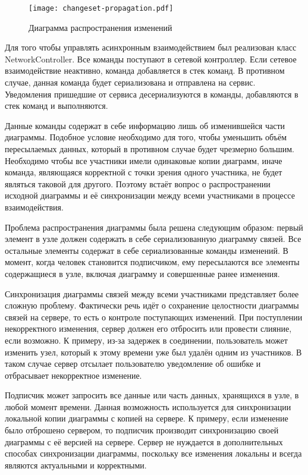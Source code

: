 \begin{figure}
  \centering
  \texttt{[image: changeset-propagation.pdf]}
  \caption{Диаграмма распространения изменений}
  \label{img:changeset_propagation}
\end{figure}

Для того чтобы управлять асинхронным взаимодействием был реализован класс
NetworkController. Все команды поступают в сетевой контроллер. Если сетевое
взаимодействие неактивно, команда добавляется в стек команд. В противном
случае, данная команда будет сериализована и отправлена на сервис. Уведомления
пришедшие от сервиса десериализуются в команды, добавляются в стек команд и
выполняются.

Данные команды содержат в себе информацию лишь об изменившейся части диаграммы.
Подобное условие необходимо для того, чтобы уменьшить объём пересылаемых данных,
который в противном случае будет чрезмерно большим. Необходимо чтобы все
участники имели одинаковые копии диаграмм, иначе команда, являющаяся корректной
с точки зрения одного участника, не будет являться таковой для другого. Поэтому
встаёт вопрос о распространении исходной диаграммы и её синхронизации между
всеми участниками в процессе взаимодействия.

Проблема распространения диаграммы была решена следующим образом: первый элемент
в узле должен содержать в себе сериализованную диаграмму связей. Все остальные
элементы содержат в себе сериализованные команды изменений. В момент, когда
человек становится подписчиком, ему пересылаются все элементы содержащиеся в
узле, включая диаграмму и совершенные ранее изменения.

Синхронизация диаграммы связей между всеми участниками представляет более
сложную проблему. Фактически речь идёт о сохранение целостности диаграммы связей
на сервере, то есть о контроле поступающих изменений. При поступлении
некорректного изменения, сервер должен его отбросить или провести слияние, если
возможно. К примеру, из-за задержек в соединении, пользователь может изменить
узел, который к этому времени уже был удалён одним из участников. В таком случае
сервер отсылает пользователю уведомление об ошибке и отбрасывает некорректное
изменение.

Подписчик может запросить все данные или часть данных, хранящихся в узле, в
любой момент времени. Данная возможность используется для синхронизации
локальной копии диаграммы с копией на сервере. К примеру, если изменение было
отброшено сервером, то подписчик производит синхронизацию своей диаграммы с её
версией на сервере. Сервер не нуждается в дополнительных способах синхронизации
диаграммы, поскольку все изменения локальны и всегда являются актуальными и
корректными.

